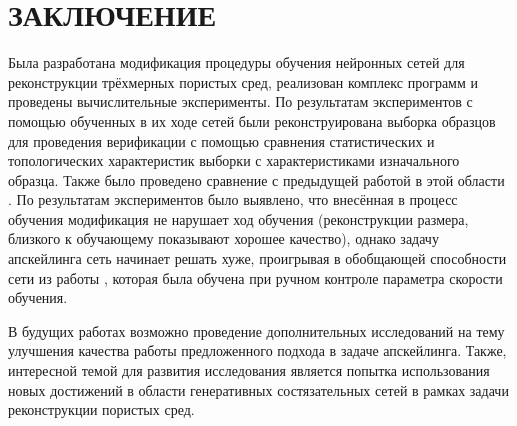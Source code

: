 \clearpage
\section*{\hfil ЗАКЛЮЧЕНИЕ \hfil}
	Была разработана модификация процедуры обучения нейронных сетей для реконструкции трёхмерных пористых сред, реализован комплекс программ и проведены вычислительные эксперименты. По результатам экспериментов с помощью обученных в их ходе сетей были реконструирована выборка образцов для проведения верификации с помощью сравнения статистических и топологических характеристик выборки с характеристиками изначального образца. Также было проведено сравнение с предыдущей работой в этой области \cite{Mosser}. По результатам экспериментов было выявлено, что внесённая в процесс обучения модификация не нарушает ход обучения (реконструкции размера, близкого к обучающему показывают хорошее качество), однако задачу апскейлинга сеть начинает решать хуже, проигрывая в обобщающей способности сети из работы \cite{Mosser}, которая была обучена при ручном контроле параметра скорости обучения.
	
	В будущих работах возможно проведение дополнительных исследований на тему улучшения качества работы предложенного подхода в задаче апскейлинга. Также, интересной темой для развития исследования является попытка использования новых достижений в области генеративных состязательных сетей в рамках задачи реконструкции пористых сред.